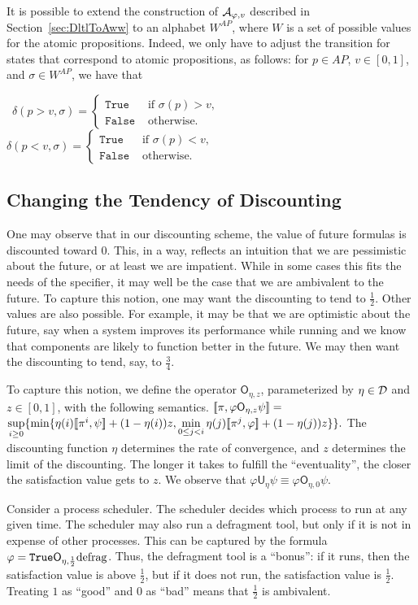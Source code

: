 \documentclass{llncs}
\newcommand{\True}{\mathtt{True}}
\newcommand{\False}{\mathtt{False}}
\newcommand{\Until}{\mathsf{U}}
\newcommand{\parUntil}{\mathsf{O}}
\newcommand{\D}{{\cal D}}
\newcommand{\A}{{\cal A}}
\renewcommand{\phi}{\varphi}
\newcommand{\df}{\eta}
\begin{document}
It is possible to extend the construction of $\A_{\phi,v}$ described in Section~\ref{sec:DltlToAww} to an alphabet $W^{AP}$, where $W$ is a set of possible values for the atomic propositions. Indeed, we only have to adjust the transition for states that correspond to atomic propositions, as follows: for $p\in AP$, $v\in [0,1]$, and $\sigma\in W^{AP}$, we have that

~$\delta(p>v,\sigma)=\begin{cases}
\True & \text{ if } \sigma(p)>v,\\
\False & \text{ otherwise.}
\end{cases}$
\hspace{.6cm}
~$\delta(p<v,\sigma)=\begin{cases}
\True & \text{ if }\sigma(p)<v,\\
\False & \text{ otherwise.}
\end{cases}$

\subsection{Changing the Tendency of Discounting}\label{sec:DiscountingTendency}
One may observe that in our discounting scheme, the value of future formulas is discounted toward $0$. This, in a way, reflects an intuition that we are pessimistic about the future, or at least we are impatient. While in some cases this fits the needs of the specifier, it may well be the case that we are ambivalent to the future. To capture this notion, one may want the discounting to tend to $\frac12$. Other values are also possible. For example, it may be that we are optimistic about the future, say when a system improves its performance while running and we know that components are likely to function better in the future. We may then want the discounting to tend, say, to $\frac34$. 

To capture this notion, we define the operator $\parUntil_{\df,z}$, parameterized by 
$\df\in \D$ and $z\in [0,1]$, with the following semantics.
$\sem{\pi, \varphi \parUntil_{\df,z} \psi}  =
$\\ $
\sup\limits_{i\ge 0} \{ \min \{\df(i)\sem{\pi^i,\psi}+(1-\df(i))z,  \min\limits_{0\leq j < i} \df(j)\sem{\pi^j,\varphi}+(1-\df(j))z\}\}.$
The discounting function $\df$ determines the rate of convergence, and $z$ determines the limit of the discounting. The longer it takes to fulfill the ``eventuality'', the closer the satisfaction value gets to $z$.
We observe that $\phi\Until_{\df}\psi\equiv \phi\parUntil_{\df,0}\psi$.
\begin{example}
Consider a process scheduler. The scheduler decides which process to run at any given time. The scheduler may also run a defragment tool, but only if it is not in expense of other processes. This can be captured by the formula $\phi=\True \parUntil_{\eta,\frac12} {\rm defrag}$. Thus, the defragment tool is a ``bonus'': if it runs, then the satisfaction value is above $\frac12$, but if it does not run, the satisfaction value is $\frac12$. Treating $1$ as ``good'' and $0$ as ``bad'' means that $\frac12$ is ambivalent.
\end{example}
\end{document}
